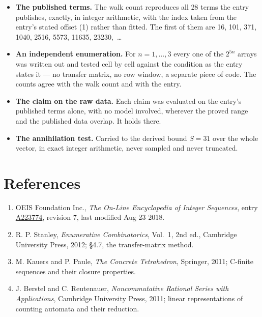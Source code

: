 \documentclass[11pt]{article}
\theoremstyle{definition}
\begin{document}
\begin{itemize}

\item {\bfseries The published terms.} The walk count reproduces all 28 terms the entry publishes, exactly, in integer arithmetic, with the index taken from the entry's stated offset (1) rather than fitted. The first of them are 16, 101, 371, 1040, 2516, 5573, 11635, 23230,~\dots

\item {\bfseries An independent enumeration.} For $n = 1,\dots,3$ every one of the $2^{5n}$ arrays was written out and tested cell by cell against the condition as the entry states it --- no transfer matrix, no row window, a separate piece of code. The counts agree with the walk count and with the entry.

\item {\bfseries The claim on the raw data.} Each claim was evaluated on the entry's published terms alone, with no model involved, wherever the proved range and the published data overlap. It holds there.

\item {\bfseries The annihilation test.} Carried to the derived bound $S = 31$ over the whole vector, in exact integer arithmetic, never sampled and never truncated.

\end{itemize}

\section{References}

\begin{enumerate}

\item OEIS Foundation Inc., \emph{The On-Line Encyclopedia of Integer Sequences}, entry \href{https://oeis.org/A223774}{A223774}, revision 7, last modified Aug 23 2018.

\item R. P. Stanley, \emph{Enumerative Combinatorics}, Vol.~1, 2nd ed., Cambridge University Press, 2012; \S4.7, the transfer-matrix method.

\item M. Kauers and P. Paule, \emph{The Concrete Tetrahedron}, Springer, 2011; C-finite sequences and their closure properties.

\item J. Berstel and C. Reutenauer, \emph{Noncommutative Rational Series with Applications}, Cambridge University Press, 2011; linear representations of counting automata and their reduction.

\end{enumerate}
\end{document}
